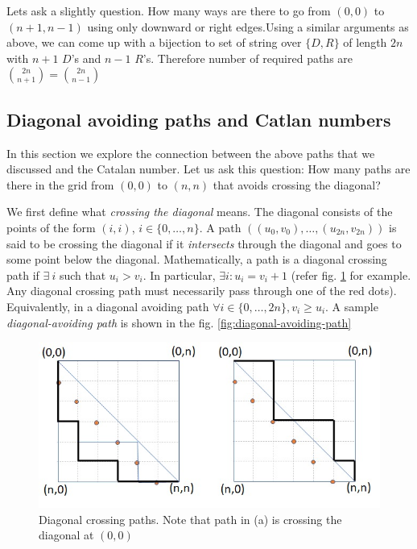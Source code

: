 Lets ask a slightly question. How many ways are there to go from $(0,0)$ to $(n+1,n-1)$ using only downward or right edges.Using a similar arguments as above, we can come up with a bijection to set of string over $\{D,R\}$ of length $2n$ with $n+1$ $D$'s and $n-1$ $R$'s. Therefore number of required paths are $\binom{2n}{n+1}=\binom{2n}{n-1}$


\subsection{Diagonal avoiding paths and Catlan numbers}
In this section we explore the connection  between the above paths that we discussed and the Catalan number. 
Let us ask this question:
How many paths are there in the grid from $(0,0)$ to $(n,n)$ that avoids crossing the diagonal? 

We first define what \textit{crossing the diagonal} means. The diagonal consists of the points of the form $(i,i)$, $i\in\{0,\ldots, n\}$. A path $((u_0,v_0), \ldots, (u_{2n},v_{2n}))$ is said to be crossing the diagonal if it \textit{intersects} through the diagonal and goes to some point below the diagonal. Mathematically, a path is a diagonal crossing path if $\exists~i$ such that $u_i>v_i$. In particular, $\exists i: u_i = v_i+1$ (refer fig. \ref{fig:diagonal-crossing-path} for example. Any diagonal crossing path must necessarily pass through one of the red dots). Equivalently, in a diagonal avoiding path $\forall i\in\{0,\ldots, 2n\}, v_i\ge u_i$. A sample \emph{diagonal-avoiding path} is shown in the fig. \ref{fig:diagonal-avoiding-path} %
\begin{figure}[h!]
    \centering
    \includegraphics[width=0.7\linewidth]{images/diagonal-crossing.jpeg}
    \caption{Diagonal crossing paths. Note that path in (a) is crossing the diagonal at $(0,0)$}
    \label{fig:diagonal-crossing-path}
\end{figure}

